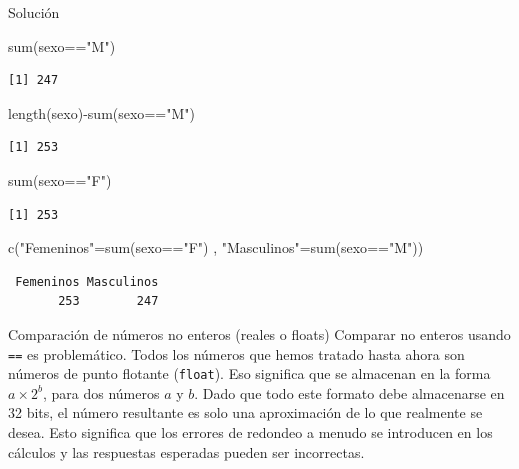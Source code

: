 \documentclass[
  ignorenonframetext,
  aspectratio=169,
  spanish,
]{beamer}
\newenvironment{Shaded}{\begin{snugshade}}{\end{snugshade}}
\newcommand{\FunctionTok}[1]{\textcolor[rgb]{0.28,0.35,0.67}{#1}}
\newcommand{\NormalTok}[1]{\textcolor[rgb]{0.00,0.23,0.31}{#1}}
\newcommand{\OtherTok}[1]{\textcolor[rgb]{0.00,0.23,0.31}{#1}}
\newcommand{\SpecialCharTok}[1]{\textcolor[rgb]{0.37,0.37,0.37}{#1}}
\newcommand{\StringTok}[1]{\textcolor[rgb]{0.13,0.47,0.30}{#1}}
\begin{document}
\begin{frame}[fragile]{Solución}
\label{soluciuxf3n-2}
\begin{Shaded}
\begin{Highlighting}[]
\FunctionTok{sum}\NormalTok{(sexo}\SpecialCharTok{==}\StringTok{"M"}\NormalTok{)}
\end{Highlighting}
\end{Shaded}

\begin{verbatim}
[1] 247
\end{verbatim}

\begin{Shaded}
\begin{Highlighting}[]
\FunctionTok{length}\NormalTok{(sexo)}\SpecialCharTok{{-}}\FunctionTok{sum}\NormalTok{(sexo}\SpecialCharTok{==}\StringTok{"M"}\NormalTok{)}
\end{Highlighting}
\end{Shaded}

\begin{verbatim}
[1] 253
\end{verbatim}

\begin{Shaded}
\begin{Highlighting}[]
\FunctionTok{sum}\NormalTok{(sexo}\SpecialCharTok{==}\StringTok{"F"}\NormalTok{) }
\end{Highlighting}
\end{Shaded}

\begin{verbatim}
[1] 253
\end{verbatim}

\begin{Shaded}
\begin{Highlighting}[]
\FunctionTok{c}\NormalTok{(}\StringTok{"Femeninos"}\OtherTok{=}\FunctionTok{sum}\NormalTok{(sexo}\SpecialCharTok{==}\StringTok{"F"}\NormalTok{) , }\StringTok{"Masculinos"}\OtherTok{=}\FunctionTok{sum}\NormalTok{(sexo}\SpecialCharTok{==}\StringTok{"M"}\NormalTok{)) }
\end{Highlighting}
\end{Shaded}

\begin{verbatim}
 Femeninos Masculinos 
       253        247 
\end{verbatim}
\end{frame}

\begin{frame}[fragile]{Comparación de números no enteros (reales o
floats)}
\label{comparaciuxf3n-de-nuxfameros-no-enteros-reales-o-floats}
Comparar no enteros usando \texttt{==} es problemático. Todos los
números que hemos tratado hasta ahora son números de punto flotante
(\texttt{float}). Eso significa que se almacenan en la forma
\(a\times 2 ^ b\), para dos números \(a\) y \(b\). Dado que todo este
formato debe almacenarse en 32 bits, el número resultante es solo una
aproximación de lo que realmente se desea. Esto significa que los
errores de redondeo a menudo se introducen en los cálculos y las
respuestas esperadas pueden ser incorrectas.
\end{frame}
\end{document}
